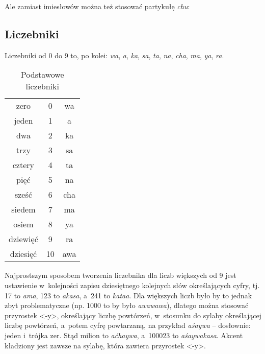\begin{spacing}{1.1}

Ale zamiast imiesłowów można też stosować partykułę \emph{chu}:






\subsection{Liczebniki}

Liczebniki od 0 do 9 to, po kolei: \emph{wa}, \emph{a}, \emph{ka}, \emph{sa}, 
\emph{ta}, \emph{na}, \emph{cha}, \emph{ma}, \emph{ya}, \emph{ra}.

\begin{table}[ht]
	\centering
	\caption{Podstawowe liczebniki}
	\begin{tabular}{ccc} \toprule
		zero & 0 & wa \\
		jeden & 1 & a \\
		dwa & 2 & ka \\
		trzy & 3 & sa \\
		cztery & 4 & ta \\
		pięć & 5 & na \\
		sześć & 6 & cha \\
		siedem & 7 & ma \\
		osiem & 8 & ya \\
		dziewięć & 9 & ra \\
		dziesięć & 10 & awa \\\bottomrule
	\end{tabular}
	\label{tab:numerals}
\end{table}

Najprostszym sposobem tworzenia liczebnika dla liczb większych od 9 jest
ustawienie w~kolejności zapisu dziesiętnego kolejnych słów określających cyfry,
tj. 17 to \emph{ama}, 123 to \emph{akasa}, a~241 to \emph{kataa}. Dla większych
liczb było by to jednak zbyt problematyczne (np. 1000 to by było
\emph{awawawa}), dlatego można stosować przyrostek <-y>, określający liczbę
powtórzeń, w~stosunku do sylaby określającej liczbę powtórzeń, a~potem cyfrę
powtarzaną, na przykład \emph{aśaywa} -- dosłownie: jeden i~trójka zer. Stąd
milion to \emph{aćhaywa}, a~100023 to \emph{aśaywakasa}. Akcent kładziony jest
zawsze na sylabę, która zawiera przyrostek <-y>.


\end{spacing}
